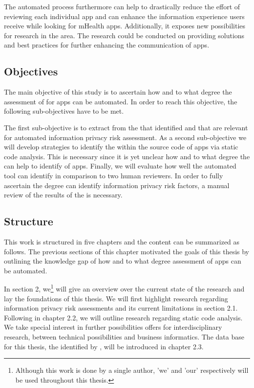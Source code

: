 The automated process furthermore can help to drastically reduce the effort of reviewing each individual app and can enhance the information experience users receive while looking for mHealth apps.
Additionally, it exposes new possibilities for research in the \ipr area. 
The research could be conducted on providing solutions and best practices for further enhancing the \ipr communication of apps.

\subsection{Objectives}

The main objective of this study is to ascertain how and to what degree the assessment of \iprfs for \mH apps can be automated.
In order to reach this objective, the following sub-objectives have to be met.

The first sub-objective is to extract \iprfs from the \ipp that \textcite{Dehling2016} identified and that are relevant for automated information privacy risk assessment.
As a second sub-objective we will develop strategies to identify the \iprfs within the source code of \mH apps via static code analysis.
This is necessary since it is yet unclear how and to what degree the \sca can help to identify \iprfs of \mH apps. 
Finally, we will evaluate how well the automated \pra tool can identify \iprfs in comparison to two human reviewers.
In order to fully ascertain the degree \sca can identify information privacy risk factors, a manual review of the results of the \sca is necessary.

\subsection{Structure}

This work is structured in five chapters and the content can be summarized as follows. 
The previous sections of this chapter motivated the goals of this thesis by outlining the knowledge gap of how and to what degree \ipr assessment of \mH apps can be automated.

In section 2, we\footnote{Although this work is done by a single author, 'we' and 'our' respectively will be used throughout this thesis.} will give an overview over the current state of the research and lay the foundations of this thesis.
We will first highlight research regarding information privacy risk assessments and its current limitations in section 2.1.
Following in chapter 2.2, we will outline research regarding static code analysis. 
We take special interest in further possibilities \sca offers for interdisciplinary research, between technical possibilities and business informatics.
The data base for this thesis, the \ipp identified by \textcite{Dehling2016}, will be introduced in chapter 2.3.

